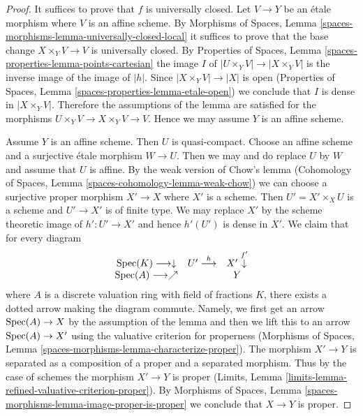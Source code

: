 \begin{proof}
It suffices to prove that $f$ is universally closed.
Let $V \to Y$ be an \'etale morphism where $V$ is an affine scheme.
By Morphisms of Spaces, Lemma
\ref{spaces-morphisms-lemma-universally-closed-local}
it suffices to prove that the base change $X \times_Y V \to V$ is
universally closed. By Properties of Spaces, Lemma
\ref{spaces-properties-lemma-points-cartesian}
the image $I$ of $|U \times_Y V| \to |X \times_Y V|$
is the inverse image of the image of $|h|$. Since
$|X \times_Y V| \to |X|$ is open
(Properties of Spaces, Lemma \ref{spaces-properties-lemma-etale-open})
we conclude that $I$ is dense in $|X \times_Y V|$.
Therefore the assumptions of the lemma are
satisfied for the morphisms $U \times_Y V \to X \times_Y V \to V$.
Hence we may assume $Y$ is an affine scheme.

\medskip\noindent
Assume $Y$ is an affine scheme. Then $U$ is quasi-compact. Choose
an affine scheme and a surjective \'etale morphism $W \to U$.
Then we may and do replace $U$ by $W$ and assume that $U$ is affine.
By the weak version of Chow's lemma
(Cohomology of Spaces, Lemma \ref{spaces-cohomology-lemma-weak-chow})
we can choose a surjective proper morphism $X' \to X$
where $X'$ is a scheme. Then $U' = X' \times_X U$ is a scheme
and $U' \to X'$ is of finite type. We may replace $X'$ by
the scheme theoretic image of $h' : U' \to X'$ and hence $h'(U')$
is dense in $X'$. We claim that for every diagram
$$
\begin{array}{ccc}\operatorname{Spec}(K) \longrightarrow\downarrow & U' \overset{h}{\longrightarrow} & X' \overset{f'}{\downarrow} \\ \operatorname{Spec}(A) \longrightarrow\nearrow &  & Y\end{array}
$$
where $A$ is a discrete valuation ring with field of fractions $K$, there
exists a dotted arrow making the diagram commute. Namely, we first get an
arrow $\operatorname{Spec}(A) \to X$ by the assumption of the lemma and then we lift this
to an arrow $\operatorname{Spec}(A) \to X'$ using the valuative criterion for properness
(Morphisms of Spaces, Lemma \ref{spaces-morphisms-lemma-characterize-proper}).
The morphism $X' \to Y$ is separated
as a composition of a proper and a separated morphism.
Thus by the case of schemes the morphism $X' \to Y$ is proper
(Limits, Lemma
\ref{limits-lemma-refined-valuative-criterion-proper}).
By Morphisms of Spaces, Lemma
\ref{spaces-morphisms-lemma-image-proper-is-proper}
we conclude that $X \to Y$ is proper.
\end{proof}

